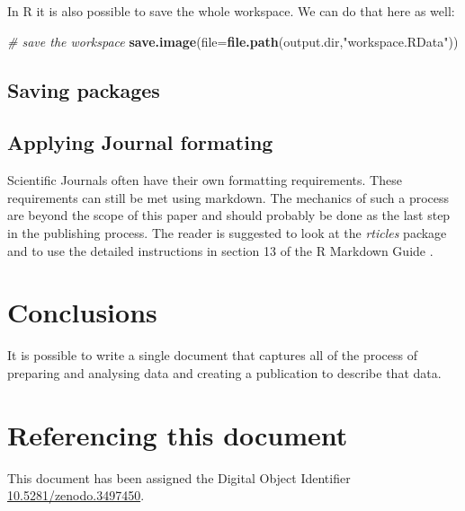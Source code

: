 \documentclass[10pt,]{article}
\newenvironment{Shaded}{\begin{snugshade}}{\end{snugshade}}
\newcommand{\CommentTok}[1]{\textcolor[rgb]{0.56,0.35,0.01}{\textit{#1}}}
\newcommand{\DataTypeTok}[1]{\textcolor[rgb]{0.13,0.29,0.53}{#1}}
\newcommand{\KeywordTok}[1]{\textcolor[rgb]{0.13,0.29,0.53}{\textbf{#1}}}
\newcommand{\NormalTok}[1]{#1}
\newcommand{\StringTok}[1]{\textcolor[rgb]{0.31,0.60,0.02}{#1}}
\begin{document}
In R it is also possible to save the whole workspace. We can do that here as well:

\begin{Shaded}
\begin{Highlighting}[]
\CommentTok{# save the workspace}
\KeywordTok{save.image}\NormalTok{(}\DataTypeTok{file=}\KeywordTok{file.path}\NormalTok{(output.dir,}\StringTok{"workspace.RData"}\NormalTok{))}
\end{Highlighting}
\end{Shaded}

\hypertarget{saving-packages}{%
\subsection{Saving packages}\label{saving-packages}}

\hypertarget{applying-journal-formating}{%
\subsection{Applying Journal formating}\label{applying-journal-formating}}

Scientific Journals often have their own formatting requirements. These requirements can still be met using markdown. The mechanics of such a process are beyond the scope of this paper and should probably be done as the last step in the publishing process. The reader is suggested to look at the \emph{rticles} package and to use the detailed instructions in section 13 of the R Markdown Guide \citep{R-Markdown-Guide}.

\hypertarget{conclusions}{%
\section{Conclusions}\label{conclusions}}

It is possible to write a single document that captures all of the process of preparing and analysing data and creating a publication to describe that data.

\hypertarget{referencing-this-document}{%
\section*{Referencing this document}\label{referencing-this-document}}

This document has been assigned the Digital Object Identifier \href{http://dx.doi.org/10.5281/zenodo.3497450}{10.5281/zenodo.3497450}.
\end{document}
